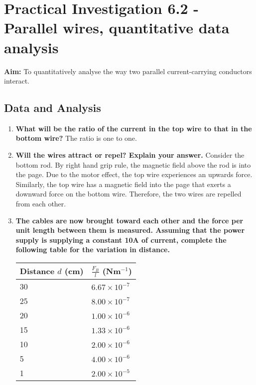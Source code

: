 \section{Practical Investigation 6.2 - Parallel wires, quantitative data analysis} \label{24/02/2025}

	\textbf{Aim:} To quantitatively analyse the way two parallel current-carrying conductors interact.

	\subsection{Data and Analysis}
	
		\begin{enumerate}
			\item \textbf{What will be the ratio of the current in the top wire to that in the bottom wire?}
				The ratio is one to one.

			\item \textbf{Will the wires attract or repel? Explain your answer.}
				Consider the bottom rod. By right hand grip rule, the magnetic field above the rod is into the page. Due to the motor effect, the top wire experiences an upwards force. Similarly, the top wire has a magnetic field into the page that exerts a downward force on the bottom wire. Therefore, the two wires are repelled from each other.

			\item \textbf{The cables are now brought toward each other and the force per unit length between them is measured. Assuming that the power supply is supplying a constant 10A of current, complete the following table for the variation in distance.}

				\begin{table}[htbp]
					\centering
					\begin{tabular}{l|l}
							Distance $d$ (cm)	& $\frac{F_B}{l}$ (Nm$^{-1}$) \\ \hline
							30			& $6.67 \times 10^{-7}$ \\
							25			& $8.00 \times 10^{-7}$ \\
							20			& $1.00 \times 10^{-6}$ \\
							15			& $1.33 \times 10^{-6}$ \\
							10			& $2.00 \times 10^{-6}$ \\
							5			& $4.00 \times 10^{-6}$ \\
							1			& $2.00 \times 10^{-5}$
					\end{tabular}
				\end{table}


\end{enumerate}
